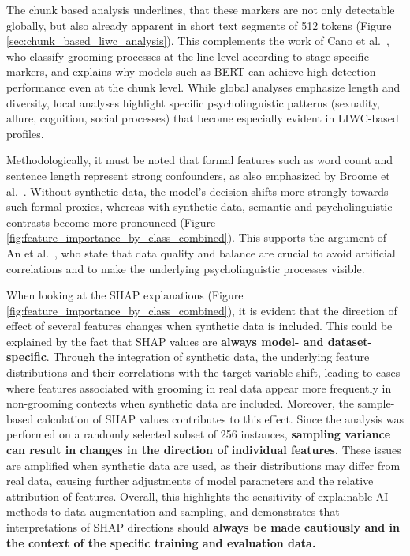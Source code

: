 The chunk based analysis underlines, that these markers are not only detectable globally, but also already apparent in short text segments of 512 tokens (Figure \ref{sec:chunk_based_liwc_analysis}). This complements the work of Cano et al.~\cite{Cano2014}, who classify grooming processes at the line level according to stage-specific markers, and explains why models such as BERT can achieve high detection performance even at the chunk level. While global analyses emphasize length and diversity, local analyses highlight specific psycholinguistic patterns (sexuality, allure, cognition, social processes) that become especially evident in LIWC-based profiles.  

Methodologically, it must be noted that formal features such as word count and sentence length represent strong confounders, as also emphasized by Broome et al.~\cite{broome2020psycholinguistic}. Without synthetic data, the model’s decision shifts more strongly towards such formal proxies, whereas with synthetic data, semantic and psycholinguistic contrasts become more pronounced (Figure \ref{fig:feature_importance_by_class_combined}). This supports the argument of An et al.~\cite{an2025cybergrooming}, who state that data quality and balance are crucial to avoid artificial correlations and to make the underlying psycholinguistic processes visible.  




When looking at the SHAP explanations (Figure \ref{fig:feature_importance_by_class_combined}), it is evident that the direction of effect of several features changes when synthetic data is included. This could be explained by the fact that SHAP values are \textbf{always model- and dataset-specific}. Through the integration of synthetic data, the underlying feature distributions and their correlations with the target variable shift, leading to cases where features associated with grooming in real data appear more frequently in non-grooming contexts when synthetic data are included. Moreover, the sample-based calculation of SHAP values contributes to this effect. Since the analysis was performed on a randomly selected subset of 256 instances, \textbf{sampling variance can result in changes in the direction of individual features.} These issues are amplified when synthetic data are used, as their distributions may differ from real data, causing further adjustments of model parameters and the relative attribution of features. Overall, this highlights the sensitivity of explainable AI methods to data augmentation and sampling, and demonstrates that interpretations of SHAP directions should \textbf{always be made cautiously and in the context of the specific training and evaluation data.}




